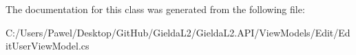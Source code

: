 The documentation for this class was generated from the following file\+:\begin{DoxyCompactItemize}
\item 
C\+:/\+Users/\+Pawel/\+Desktop/\+Git\+Hub/\+Gielda\+L2/\+Gielda\+L2.\+A\+P\+I/\+View\+Models/\+Edit/Edit\+User\+View\+Model.\+cs\end{DoxyCompactItemize}
